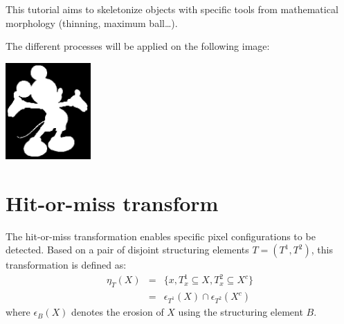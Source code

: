 \def\difficulty{2}

\begin{note}This tutorial aims to skeletonize objects with specific tools from mathematical morphology (thinning, maximum ball\dots).
\end{note}

\noindent The different processes will be applied on the following image:
\begin{center}\includegraphics[width=3.25cm]{mickey.png}
\end{center}
\vspace*{-10pt}


\section{Hit-or-miss transform}
The hit-or-miss transformation enables specific pixel configurations to be detected. Based on a pair of disjoint structuring elements $T=(T^1,T^2)$, this transformation is defined as:
\begin{eqnarray}
\eta_T(X)&=&\{x, T_x^1\subseteq X, T_x^2\subseteq X^c\}\\
&=&\epsilon_{T^1}(X)\cap \epsilon_{T^2}(X^c)
\end{eqnarray}
where $\epsilon_{B}(X)$ denotes the erosion of $X$ using the structuring element $B$.


